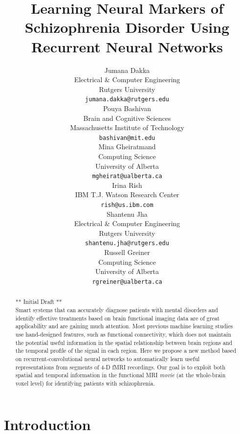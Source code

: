 \documentclass{article}
\title{Learning Neural Markers of Schizophrenia Disorder Using Recurrent Neural Networks}
\author{
Jumana Dakka\\
Electrical \& Computer Engineering\\
Rutgers University\\
\texttt{jumana.dakka@rutgers.edu} \\
\And
Pouya Bashivan\\
Brain and Cognitive Sciences\\
Massachusetts Institute of Technology\\
\texttt{bashivan@mit.edu} \\
\And
Mina Gheiratmand\\
Computing Science\\
University of Alberta\\
\texttt{mgheirat@ualberta.ca}\\
\And
Irina Rish\\
IBM T.J. Watson Research Center\\
\texttt{rish@us.ibm.com}\\
\And
Shantenu Jha\\
Electrical \& Computer Engineering\\
Rutgers University\\
\texttt{shantenu.jha@rutgers.edu}\\
\And
Russell Greiner\\
Computing Science\\
University of Alberta\\
\texttt{rgreiner@ualberta.ca}\\
}
\begin{document}

\maketitle

\begin{abstract}

** Initial Draft ** \\
Smart systems that can accurately diagnose patients with mental disorders and identify effective treatments based on brain functional imaging data are of great applicability and are gaining much attention. Most previous machine learning studies use hand-designed features, such as functional connectivity, which does not maintain the potential useful information in the spatial relationship between brain regions and the temporal profile of the signal in each region. Here we propose a new method based on recurrent-convolutional neural networks to automatically learn useful representations from segments of 4-D fMRI recordings. Our goal is to exploit both spatial and temporal information in the functional MRI \textit{movie} (at the whole-brain voxel level) for identifying patients with schizophrenia. %

\end{abstract}

\section{Introduction}
\end{document}
